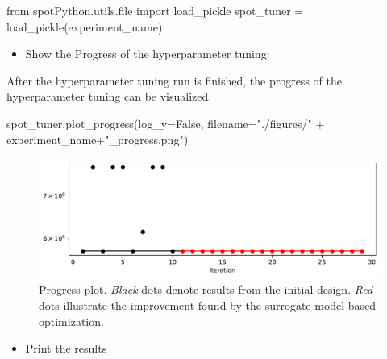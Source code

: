 \documentclass[
  letterpaper,
  DIV=11,
  numbers=noendperiod]{scrreprt}
\newenvironment{Shaded}{\begin{snugshade}}{\end{snugshade}}
\newcommand{\BuiltInTok}[1]{\textcolor[rgb]{0.00,0.23,0.31}{#1}}
\newcommand{\ImportTok}[1]{\textcolor[rgb]{0.00,0.46,0.62}{#1}}
\newcommand{\NormalTok}[1]{\textcolor[rgb]{0.00,0.23,0.31}{#1}}
\newcommand{\OperatorTok}[1]{\textcolor[rgb]{0.37,0.37,0.37}{#1}}
\newcommand{\StringTok}[1]{\textcolor[rgb]{0.13,0.47,0.30}{#1}}
\newcommand{\VariableTok}[1]{\textcolor[rgb]{0.07,0.07,0.07}{#1}}
\providecommand{\tightlist}{%
  \setlength{\itemsep}{0pt}\setlength{\parskip}{0pt}}\usepackage{longtable,booktabs,array}
\begin{document}
\begin{Shaded}
\begin{Highlighting}[]
\ImportTok{from}\NormalTok{ spotPython.utils.}\BuiltInTok{file} \ImportTok{import}\NormalTok{ load\_pickle}
\NormalTok{spot\_tuner }\OperatorTok{=}\NormalTok{ load\_pickle(experiment\_name)}
\end{Highlighting}
\end{Shaded}

\begin{itemize}
\tightlist
\item
  Show the Progress of the hyperparameter tuning:
\end{itemize}

After the hyperparameter tuning run is finished, the progress of the
hyperparameter tuning can be visualized.

\begin{Shaded}
\begin{Highlighting}[]
\NormalTok{spot\_tuner.plot\_progress(log\_y}\OperatorTok{=}\VariableTok{False}\NormalTok{,}
\NormalTok{    filename}\OperatorTok{=}\StringTok{"./figures/"} \OperatorTok{+}\NormalTok{ experiment\_name}\OperatorTok{+}\StringTok{"\_progress.png"}\NormalTok{)}
\end{Highlighting}
\end{Shaded}

\begin{figure}[H]

{\centering \includegraphics{017_spot_hpt_sklearn_classification_files/figure-pdf/cell-22-output-1.pdf}

}

\caption{Progress plot. \emph{Black} dots denote results from the
initial design. \emph{Red} dots illustrate the improvement found by the
surrogate model based optimization.}

\end{figure}

\begin{itemize}
\tightlist
\item
  Print the results
\end{itemize}
\end{document}
